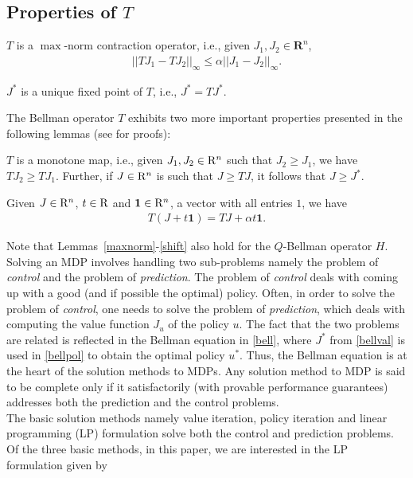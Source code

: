 \documentclass[12pt,draftcls,onecolumn]{IEEEtran}
\begin{document}
\subsection{Properties of $T$}
\begin{lemma}\label{maxnorm}
$T$ is a $\max$-norm contraction operator, i.e., given $J_1, J_2 \in \mathbf{R}^n$,
\begin{align}
||TJ_1-TJ_2||_\infty\leq \alpha ||J_1-J_2||_\infty.
\end{align}
\end{lemma}
\begin{corollary}\label{uniquesol}
$J^*$ is a unique fixed point of $T$, i.e., $J^*=TJ^*$.
\end{corollary}
The Bellman operator $T$ exhibits two more important properties presented in the following lemmas (see \cite{BertB} for proofs):
\begin{lemma}\label{monotone}
$T$ is a monotone map, i.e., given $J_1,J_2 \in \mathrm{R}^n$ such that $J_2\geq J_1$, we have $T J_2\geq T J_1$. Further, if $J\in \mathrm{R}^n$ is such that $J\geq TJ$, it follows that $J\geq J^*$.
\end{lemma}
\begin{lemma}\label{shift}
Given $J\in \mathrm{R}^n$, $t \in \mathrm{R}$ and $\mathbf{1} \in \mathrm{R}^n$, a vector with all entries $1$, we have
\begin{align}
T(J+t\mathbf{1})=TJ+\alpha t\mathbf{1}.
\end{align}
\end{lemma}
Note that Lemmas~\ref{maxnorm}-\ref{shift} also hold for the $Q$-Bellman operator $H$.
Solving an MDP involves handling two sub-problems namely the problem of \emph{control} and the problem of \emph{prediction}. The problem of \emph{control} deals with coming up with a good (and if possible the optimal) policy. Often, in order to solve the problem of \emph{control}, one needs to solve the problem of \emph{prediction}, which deals with computing the value function $J_u$ of the policy $u$. The fact that the two problems are related is reflected in the Bellman equation in \eqref{bell}, where $J^*$ from \eqref{bellval} is used in \eqref{bellpol} to obtain the optimal policy $u^*$. Thus, the Bellman equation is at the heart of the solution methods to MDPs. Any solution method to MDP is said to be complete only if it satisfactorily (with provable performance guarantees) addresses both the prediction and the control problems. \\
The basic solution methods namely value iteration, policy iteration and linear programming (LP) formulation \cite{BertB} solve both the control and prediction problems. Of the three basic methods, in this paper, we are interested in the LP formulation given by
\end{document}

